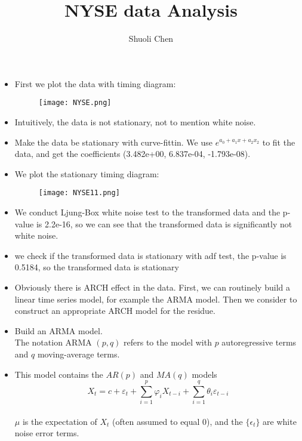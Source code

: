 \documentclass[10 pt]{beamer}
\title[]{NYSE data Analysis}
\author[Shuoli Chen]{Shuoli Chen \\[2mm]}
\institute[]{Institute of Statistics \& Big Data \\ Renmin University of China
	
}
\date{}
\begin{document}
	
	\begin{frame}
	\titlepage
\end{frame}


\begin{frame}
	\begin{itemize}
		\item First we plot the data with timing diagram:
		\begin {figure}[h]
		\centering
		\texttt{[image: NYSE.png]}
		\end {figure}
		\item Intuitively, the data is not stationary, not to mention white noise.
	\end{itemize}
\end{frame}



\begin{frame}
	\begin{itemize}
		\item Make the data be stationary with curve-fittin.
		We use $e^{a_0+a_1x+a_2x_2}$ to fit the data, and get the coefficients
		(3.482e+00,    6.837e-04,   -1.793e-08).
		\item We plot the stationary timing diagram:
				\begin {figure}[h]
				\centering
				\texttt{[image: NYSE11.png]}
				\end {figure}
	\end{itemize}
\end{frame}


\begin{frame}
	\begin{itemize}
		\item 
		We conduct Ljung-Box white noise test to the transformed data and the p-value is 2.2e-16, so we can see that the transformed data is significantly not white noise.
		\item we check if the transformed data is stationary with adf test, the p-value is 0.5184, so the transformed data is stationary
		\item Obviously there is ARCH effect in the data. First, we can routinely build a linear time series model, for example the ARMA model. Then we consider to construct an appropriate ARCH model for the residue.
	\end{itemize}
\end{frame}

\begin{frame}


\begin{itemize}
	\item Build an ARMA model.\\
	The notation ARMA $(p, q)$ refers to the model with $p$ autoregressive terms and $q$ moving-average terms. 
    \item This model contains the $A R(p)$ and $M A(q)$ models
	\[
	X_{t}=c+\varepsilon_{t}+\sum_{i=1}^{p} \varphi_{i} X_{t-i}+\sum_{i=1}^{q} \theta_{i} \varepsilon_{t-i}
	\]\\
	$\mu$ is the expectation of $X_{t}$ (often assumed to equal 0), and the $\{\epsilon_t\}$ are white noise error terms.
\end{itemize}
\end{frame}
\end{document}
